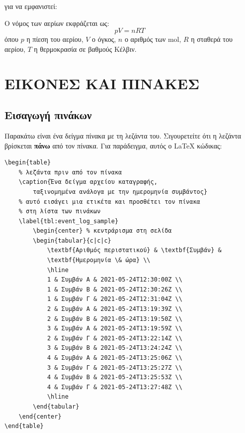 \documentclass[inscr,ack,preface]{dimscthesis}
\begin{document}
για να εμφανιστεί:

Ο νόμος των αερίων εκφράζεται ως:
\begin{equation}
    p V = n R T
\end{equation}
όπου \(p\) η πίεση του αερίου,
\(V\) ο όγκος,
\(n\) ο αριθμός των mol,
\(R\) η σταθερά του αερίου,
\(T\) η θερμοκρασία σε βαθμούς Κέλβιν.

\chapter{ΕΙΚΟΝΕΣ ΚΑΙ ΠΙΝΑΚΕΣ} \label{figures_and_tables}

\section{Εισαγωγή πινάκων} \label{inserting_tables}

Παρακάτω είναι ένα δείγμα πίνακα με τη λεζάντα του.
Σιγουρετείτε ότι η λεζάντα βρίσκεται \textbf{πάνω} από τον πίνακα.
Για παράδειγμα, αυτός ο \LaTeX{} κώδικας:

\begin{verbatim}
\begin{table}
    % λεζάντα πριν από τον πίνακα
    \caption{Ένα δείγμα αρχείου καταγραφής,
        ταξινομημένα ανάλογα με την ημερομηνία συμβάντος}
    % αυτό εισάγει μια ετικέτα και προσθέτει τον πίνακα
    % στη λίστα των πινάκων
    \label{tbl:event_log_sample}
        \begin{center} % κεντράρισμα στη σελίδα
        \begin{tabular}{c|c|c}
            \textbf{Αριθμός περιστατικού} & \textbf{Συμβάν} &
            \textbf{Ημερομηνία \& ώρα} \\
            \hline
            1 & Συμβάν Α & 2021-05-24T12:30:00Z \\
            1 & Συμβάν Β & 2021-05-24T12:30:26Z \\
            1 & Συμβάν Γ & 2021-05-24T12:31:04Z \\
            2 & Συμβάν Α & 2021-05-24T13:19:39Z \\
            2 & Συμβάν Β & 2021-05-24T13:19:50Z \\
            3 & Συμβάν Α & 2021-05-24T13:19:59Z \\
            2 & Συμβάν Γ & 2021-05-24T13:22:14Z \\
            3 & Συμβάν Β & 2021-05-24T13:24:24Z \\
            4 & Συμβάν Α & 2021-05-24T13:25:06Z \\
            3 & Συμβάν Γ & 2021-05-24T13:25:27Z \\
            4 & Συμβάν Β & 2021-05-24T13:25:53Z \\
            4 & Συμβάν Γ & 2021-05-24T13:27:48Z \\
            \hline
        \end{tabular}
    \end{center}
\end{table}
\end{verbatim}
\end{document}

